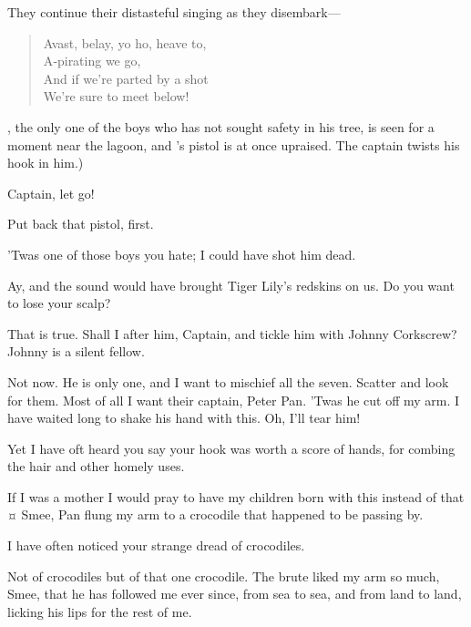 \begin{drama}
{They continue their distasteful singing as they disembark—

\begin{verse}
	Avast, belay, yo ho, heave to,\\
	A‐pirating we go,\\
	And if we’re parted by a shot\\
	We’re sure to meet below!
\end{verse}

\nibs, the only one of the boys who has not sought safety in his tree, is seen for a moment near the lagoon,
and \starkey’s pistol is at once upraised.
The captain twists his hook in him.)%
}

Captain, let go!

\hookspeaks
Put back that pistol, first.

\starkeyspeaks
’Twas one of those boys you hate; I could have shot him dead.

\hookspeaks
Ay, and the sound would have brought Tiger Lily’s redskins on us.
Do you want to lose your scalp?

That is true.
Shall I after him, Captain, and tickle him with Johnny Corkscrew?
Johnny is a silent fellow.

\hookspeaks
Not now.
He is only one, and I want to mischief all the seven.
Scatter and look for them.
Most of all I want their captain, Peter Pan.
’Twas he cut off my arm.
I have waited long to shake his hand with this.
Oh, I'll tear him!

Yet I have oft heard you say your hook was worth a score of hands, for combing the hair and other homely uses.

\hookspeaks
If I was a mother I would pray to have my children born with this instead of that
¤
Smee, Pan flung my arm to a crocodile that happened to be passing by.

\smeespeaks
I have often noticed your strange dread of crocodiles.

Not of crocodiles but of that one crocodile.
The brute liked my arm so much, Smee, that he has followed me ever since, from sea to sea, and from land to land, licking his lips for the rest of me.


\end{drama}
